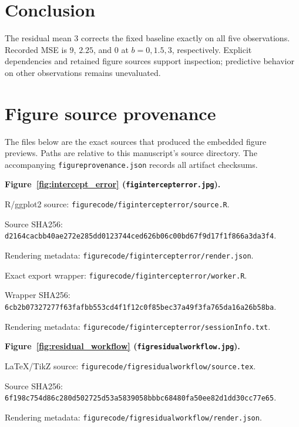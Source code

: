 \documentclass[11pt]{article}
\begin{document}
\clearpage
\section{Conclusion}
The residual mean \(3\) corrects the fixed baseline exactly on all five observations. Recorded MSE is \(9\), \(2.25\), and \(0\) at \(b=0,1.5,3\), respectively. Explicit dependencies and retained figure sources support inspection; predictive behavior on other observations remains unevaluated.



\clearpage
\section*{Figure source provenance}
The files below are the exact sources that produced the embedded figure previews. Paths are relative to this manuscript's source directory. The accompanying \texttt{figureprovenance.json} records all artifact checksums.\par
\medskip\noindent\textbf{Figure~\ref{fig:intercept_error} (\texttt{figintercepterror.jpg}).}\par
\noindent R/ggplot2 source: \texttt{figurecode/\allowbreak{}figintercepterror/\allowbreak{}source.R}.\par
\noindent Source SHA256: \texttt{d2164cac\allowbreak{}bb40ae27\allowbreak{}2e285dd0\allowbreak{}123744ce\allowbreak{}d626b06c\allowbreak{}00bd67f9\allowbreak{}d17f1f86\allowbreak{}6a3da3f4}.\par
\noindent Rendering metadata: \texttt{figurecode/\allowbreak{}figintercepterror/\allowbreak{}render.json}.\par
\noindent Exact export wrapper: \texttt{figurecode/\allowbreak{}figintercepterror/\allowbreak{}worker.R}.\par
\noindent Wrapper SHA256: \texttt{6cb2b073\allowbreak{}27277f63\allowbreak{}fafbb553\allowbreak{}cd4f1f12\allowbreak{}c0f85bec\allowbreak{}37a49f3f\allowbreak{}a765da16\allowbreak{}a26b58ba}.\par
\noindent Rendering metadata: \texttt{figurecode/\allowbreak{}figintercepterror/\allowbreak{}sessionInfo.txt}.\par
\medskip\noindent\textbf{Figure~\ref{fig:residual_workflow} (\texttt{figresidualworkflow.jpg}).}\par
\noindent LaTeX/TikZ source: \texttt{figurecode/\allowbreak{}figresidualworkflow/\allowbreak{}source.tex}.\par
\noindent Source SHA256: \texttt{6f198c75\allowbreak{}4d86c280\allowbreak{}d502725d\allowbreak{}53a58390\allowbreak{}58bbbc68\allowbreak{}480fa50e\allowbreak{}e82d1dd3\allowbreak{}0cc77e65}.\par
\noindent Rendering metadata: \texttt{figurecode/\allowbreak{}figresidualworkflow/\allowbreak{}render.json}.\par
\end{document}
